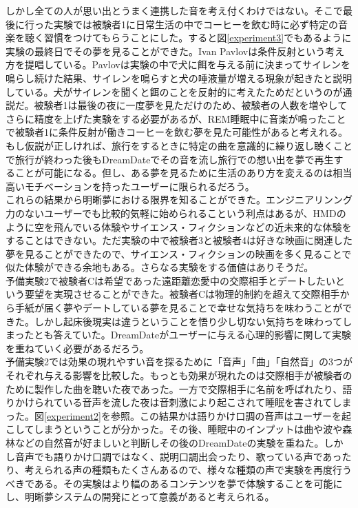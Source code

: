 しかし全ての人が思い出とうまく連携した音を考え付くわけではない。そこで最後に行った実験では被験者1に日常生活の中でコーヒーを飲む時に必ず特定の音楽を聴く習慣をつけてもらうことにした。すると図\ref{experiment3}でもあるように実験の最終日でその夢を見ることができた。Ivan Pavlovは条件反射という考え方を提唱している\cite{pavlov}。Pavlovは実験の中で犬に餌を与える前に決まってサイレンを鳴らし続けた結果、サイレンを鳴らすと犬の唾液量が増える現象が起きたと説明している。犬がサイレンを聞くと餌のことを反射的に考えたためだというのが通説だ。被験者1は最後の夜に一度夢を見ただけのため、被験者の人数を増やしてさらに精度を上げた実験をする必要があるが、REM睡眠中に音楽が鳴ったことで被験者1に条件反射が働きコーヒーを飲む夢を見た可能性があると考えれる。もし仮説が正しければ、旅行をするときに特定の曲を意識的に繰り返し聴くことで旅行が終わった後もDreamDateでその音を流し旅行での想い出を夢で再生することが可能になる。但し、ある夢を見るために生活のあり方を変えるのは相当高いモチベーションを持ったユーザーに限られるだろう。\\

これらの結果から明晰夢における限界を知ることができた。エンジニアリンング力のないユーザーでも比較的気軽に始められるこという利点はあるが、HMDのように空を飛んでいる体験やサイエンス・フィクションなどの近未来的な体験をすることはできない。ただ実験の中で被験者3と被験者4は好きな映画に関連した夢を見ることができたので、サイエンス・フィクションの映画を多く見ることで似た体験ができる余地もある。さらなる実験をする価値はありそうだ。\\

予備実験2で被験者Cは希望であった遠距離恋愛中の交際相手とデートしたいという要望を実現させることができた。被験者Cは物理的制約を超えて交際相手から手紙が届く夢やデートしている夢を見ることで幸せな気持ちを味わうことができた。しかし起床後現実は違うということを悟り少し切ない気持ちを味わってしまったとも答えていた。DreamDateがユーザーに与える心理的影響に関して実験を重ねていく必要があるだろう。\\

予備実験2では効果の現れやすい音を探るために「音声」「曲」「自然音」の3つがそれぞれ与える影響を比較した。もっとも効果が現れたのは交際相手が被験者のために製作した曲を聴いた夜であった。一方で交際相手に名前を呼ばれたり、語りかけられている音声を流した夜は音刺激により起こされて睡眠を害されてしまった。図\ref{experiment2}を参照。この結果かは語りかけ口調の音声はユーザーを起こしてしまうということが分かった。その後、睡眠中のインプットは曲や波や森林などの自然音が好ましいと判断しその後のDreamDateの実験を重ねた。しかし音声でも語りかけ口調ではなく、説明口調出会ったり、歌っている声であったり、考えられる声の種類もたくさんあるので、様々な種類の声で実験を再度行うべきである。その実験はより幅のあるコンテンツを夢で体験することを可能にし、明晰夢システムの開発にとって意義があると考えられる。\\

